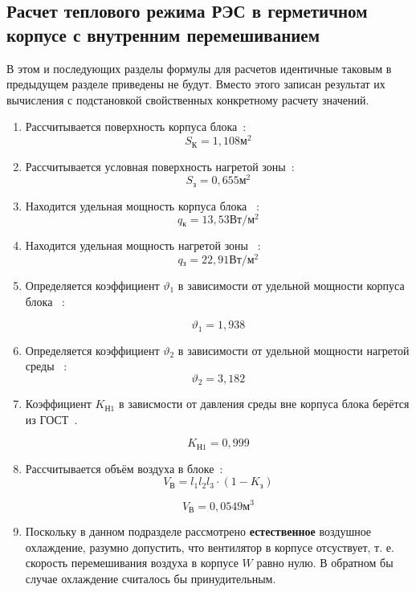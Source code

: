 \subsection{Расчет теплового режима РЭС в герметичном корпусе с внутренним перемешиванием}

В этом и последующих разделы формулы для расчетов идентичные таковым в
предыдущем разделе приведены не будут. Вместо этого записан результат
их вычисления с подстановкой свойственных конкретному расчету
значений.

\begin{enumerate}[label={\arabic*.}]
\item Рассчитывается поверхность корпуса блока~\cite{Rotkop1976}: %
  $$S\mathrm{_{К}}=1,108\mathrm{м^2}$$
\item Рассчитывается условная поверхность нагретой зоны~\cite{Rotkop1976}: %
  $$S\mathrm{_{з}} = 0,655\mathrm{м^2}$$ 
\item Находится удельная мощность корпуса блока ~\cite{Rotkop1976}:  %
  $$q\mathrm{_к} = 13,53\mathrm{Вт/м^2}$$
\item Находится удельная мощность нагретой зоны ~\cite{Rotkop1976}: %
  $$q\mathrm{_з} = 22,91 \mathrm{ Вт/м^2}$$

\item Определяется коэффициент $\vartheta_1$ в зависимости от удельной мощности корпуса блока ~\cite{Rotkop1976}:

  $$\vartheta_1=1,938$$
\item Определяется коэффициент $\vartheta_2$ в зависимости от удельной мощности нагретой среды ~\cite{Rotkop1976}:
  $$\vartheta_2=3,182$$

  \item Коэффициент $K\mathrm{_{Н1}}$ в зависмости от давления
  среды вне корпуса блока берётся из ГОСТ~\cite{GOST_15150-69}.

  $$K\mathrm{_{Н1}} = 0,999$$
\item Рассчитывается объём воздуха в блоке~\cite{Rotkop1976}:
  \begin{equation}
    V\mathrm{_{В}} = l_1 l_2 l_3 \cdot (1 - K\mathrm{_з})
  \end{equation}

  $$V\mathrm{_{В}} = 0,0549\mathrm{м^3}$$

\item Поскольку в данном подразделе
    рассмотрено \textbf{естественное} воздушное охлаждение,
    разумно допустить, что вентилятор в корпусе отсуствует, т. е.
    скорость перемешивания воздуха в корпусе $W$ равно нулю.
    В обратном бы случае охлаждение считалось бы принудительным.


\end{enumerate}
